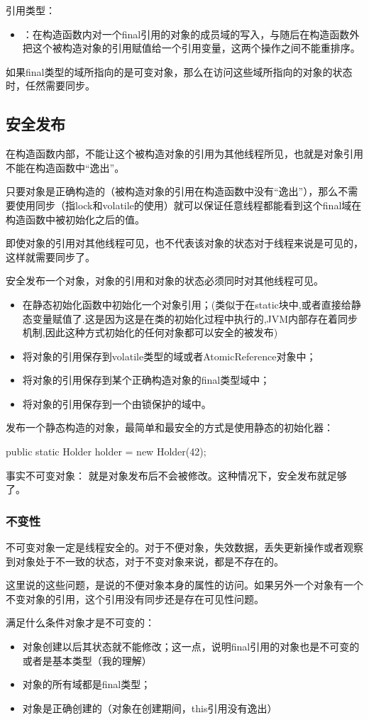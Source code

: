引用类型：
\begin{itemize}
\item ：在构造函数内对一个final引用的对象的成员域的写入，与随后在构造函数外把这个被构造对象的引用赋值给一个引用变量，这两个操作之间不能重排序。
\end{itemize}

如果final类型的域所指向的是可变对象，那么在访问这些域所指向的对象的状态时，任然需要同步。

\subsection{安全发布}

在构造函数内部，不能让这个被构造对象的引用为其他线程所见，也就是对象引用不能在构造函数中“逸出”。

只要对象是正确构造的（被构造对象的引用在构造函数中没有“逸出”），那么不需要使用同步（指lock和volatile的使用）就可以保证任意线程都能看到这个final域在构造函数中被初始化之后的值。

即使对象的引用对其他线程可见，也不代表该对象的状态对于线程来说是可见的，这样就需要同步了。

安全发布一个对象，对象的引用和对象的状态必须同时对其他线程可见。
\begin{itemize}
\item 在静态初始化函数中初始化一个对象引用；(类似于在static块中,或者直接给静态变量赋值了.这是因为这是在类的初始化过程中执行的,JVM内部存在着同步机制,因此这种方式初始化的任何对象都可以安全的被发布)
\item 将对象的引用保存到volatile类型的域或者AtomicReference对象中；
\item 将对象的引用保存到某个正确构造对象的final类型域中；
\item 将对象的引用保存到一个由锁保护的域中。
\end{itemize}

发布一个静态构造的对象，最简单和最安全的方式是使用静态的初始化器：
\begin{Java}
public static Holder holder = new Holder(42);
\end{Java}

事实不可变对象：
就是对象发布后不会被修改。这种情况下，安全发布就足够了。

\subsubsection{不变性}

不可变对象一定是线程安全的。对于不便对象，失效数据，丢失更新操作或者观察到对象处于不一致的状态，对于不变对象来说，都是不存在的。

这里说的这些问题，是说的不便对象本身的属性的访问。如果另外一个对象有一个不变对象的引用，这个引用没有同步还是存在可见性问题。

满足什么条件对象才是不可变的：
\begin{itemize}
\item 对象创建以后其状态就不能修改；这一点，说明final引用的对象也是不可变的或者是基本类型（我的理解）
\item 对象的所有域都是final类型；
\item 对象是正确创建的（对象在创建期间，this引用没有逸出）
\end{itemize}
